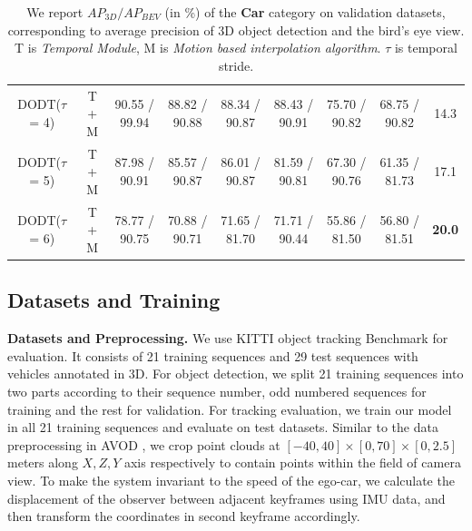 \documentclass[letterpaper, 10pt, conference]{ieeeconf}  %
\begin{document}
\begin{table}
{\begin{tabular}{ccccccccc}
			\multicolumn{1}{c|}{DODT($\tau$ = 4)}     &\multicolumn{1}{c|}{T + M} & 90.55 / 99.94  & 88.82 / 90.88 & \multicolumn{1}{c|}{88.34 / 90.87}  & 88.43 / 90.91 & 75.70 / 90.82 & \multicolumn{1}{c|}{68.75 / 90.82}   & 14.3\\
			\multicolumn{1}{c|}{DODT($\tau$ = 5)}     &\multicolumn{1}{c|}{T + M} & 87.98 / 90.91  & 85.57 / 90.87 & \multicolumn{1}{c|}{86.01 / 90.87}  & 81.59 / 90.81 & 67.30 / 90.76 & \multicolumn{1}{c|}{61.35 / 81.73}   & 17.1\\
			\multicolumn{1}{c|}{DODT($\tau$ = 6)}     &\multicolumn{1}{c|}{T + M} & 78.77 / 90.75  & 70.88 / 90.71 & \multicolumn{1}{c|}{71.65 / 81.70}  & 71.71 / 90.44 & 55.86 / 81.50 & \multicolumn{1}{c|}{56.80 / 81.51}   & \textbf{20.0} \\ \midrule
	\end{tabular}}
	\setlength{\abovecaptionskip}{-1pt}
	\caption{We report $AP_{3D}/AP_{BEV}$ (in \%) of the \textbf{Car} category on validation datasets, corresponding to average precision of 3D object detection and the bird's eye view. T is \textit{Temporal Module}, M is \textit{Motion based interpolation algorithm}. $\tau$ is temporal stride.} 
	\setlength{\belowcaptionskip}{1pt}
	\label{table:result_detection}
	\vspace{-0.5cm}
\end{table}

\subsection{Datasets and Training}

\textbf{Datasets and Preprocessing.} We use KITTI object tracking Benchmark \cite{geiger2013vision} for evaluation. It consists of 21 training sequences and 29 test sequences with vehicles annotated in 3D. For object detection, we split 21 training sequences into two parts according to their sequence number, odd numbered sequences for training and the rest for validation. For tracking evaluation, we train our model in all 21 training sequences and evaluate on test datasets. Similar to the data preprocessing in AVOD \cite{ku2018joint}, we crop point clouds at $[-40, 40] \times [0, 70] \times [0, 2.5]$ meters along $X, Z, Y$ axis respectively to contain points within the field of camera view. To make the system invariant to the speed of the ego-car, we calculate the displacement of the observer between adjacent keyframes using IMU data, and then transform the coordinates in second keyframe accordingly. 
\end{document}

